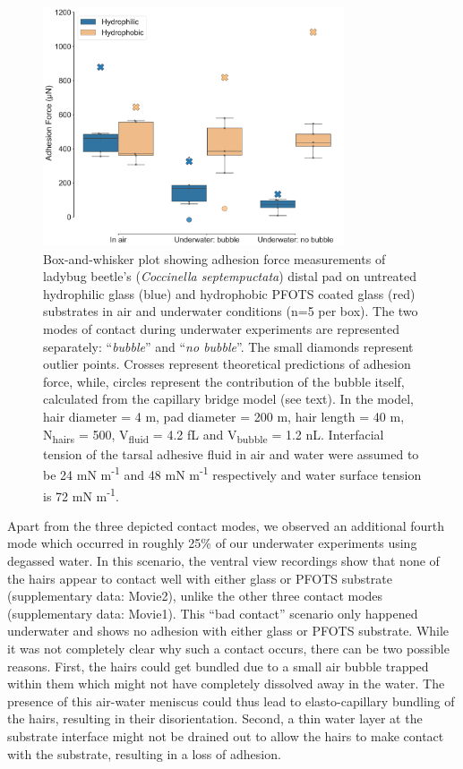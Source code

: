 \documentclass[vruler,JEB]{COB}%
\begin{document}
\begin{figure}
\includegraphics[width=3.5in]{Figure2-Expt_effect_of_contact}\caption{\label{fig:Effect-of-contact}Box-and-whisker plot showing
 adhesion force measurements of ladybug beetle's (\emph{Coccinella
septempuctata}) distal pad on untreated hydrophilic glass (blue) and hydrophobic PFOTS coated glass (red) substrates in air and underwater
conditions (n=5 per box). The two modes of contact during underwater experiments
are represented separately: \textquotedblleft\emph{bubble}\textquotedblright{}
and \textquotedblleft\emph{no bubble}\textquotedblright . The small diamonds represent outlier points. Crosses
represent theoretical predictions of adhesion force, while, circles
represent the contribution of the bubble itself, calculated from the
capillary bridge model (see text). In the model, hair diameter = 4 \textmu m,
pad diameter = 200 \textmu m, hair length = 40 \textmu m,
N\protect\textsubscript{hairs} = 500, V\protect\textsubscript{fluid}
= 4.2 fL and V\protect\textsubscript{bubble} = 1.2 nL. Interfacial
tension of the tarsal adhesive fluid in air and water were assumed to be
24 mN m\protect\textsuperscript{-1} and 48 mN m\protect\textsuperscript{-1} respectively and water surface tension is 72 mN m\protect\textsuperscript{-1}.}
\end{figure}

Apart from the three depicted contact modes, we observed an additional
fourth mode which occurred in roughly 25\% of our underwater experiments using degassed water.
In this scenario, the ventral view recordings show that none of the hairs
appear to contact well with either glass or PFOTS substrate (supplementary data: Movie2), unlike the other
three contact modes (supplementary data: Movie1). This ``bad contact'' scenario only happened underwater and shows no adhesion 
with either glass or PFOTS substrate. While it was not completely
clear why such a contact occurs, there can be two possible reasons.
First, the hairs could get bundled due to a small air bubble trapped within
them which might not have completely dissolved away in the water.
The presence of this air-water meniscus could thus lead to elasto-capillary bundling of the hairs, resulting in their disorientation. Second, a thin water
layer at the substrate interface might not be drained out to allow
the hairs to make contact with the substrate, resulting in a loss
of adhesion.
\end{document}
